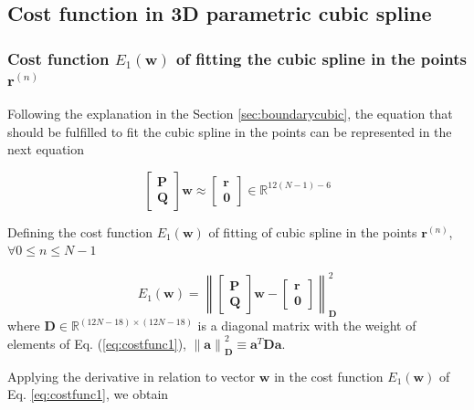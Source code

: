 \subsection{Cost function in 3D parametric cubic spline}

\subsubsection{Cost function $E_{1}(\mathbf{w})$ of fitting the cubic spline in the points $\mathbf{r}^{(n)}$}

Following the explanation in the Section \ref{sec:boundarycubic},
the equation that should be fulfilled to fit the cubic spline in the points can be represented in the next equation

\begin{equation}
\begin{bmatrix}
\mathbf{P}\\
\mathbf{Q}
\end{bmatrix}
\mathbf{w}
\approx
\begin{bmatrix}
\mathbf{r}\\
\mathbf{0}
\end{bmatrix}
\in \mathbb{R}^{12(N-1)-6}
\end{equation}

Defining the cost function $E_{1}(\mathbf{w})$ of fitting of cubic spline in the points $\mathbf{r}^{(n)}$,
$\forall 0\leq n\leq N-1$

\begin{equation}\label{eq:costfunc1}
E_{1}(\mathbf{w})
=
\left\|
\begin{bmatrix}
\mathbf{P}\\
\mathbf{Q}
\end{bmatrix}
\mathbf{w}
-
\begin{bmatrix}
\mathbf{r}\\
\mathbf{0}
\end{bmatrix}
\right\|_{\mathbf{D}}^{2}
\end{equation}
where $\mathbf{D}\in \mathbb{R}^{(12N-18)\times(12N-18)}$ is a diagonal matrix with the weight of elements of Eq. (\ref{eq:costfunc1}), 
$\left\|\mathbf{a}\right\|_{\mathbf{D}}^{2}\equiv \mathbf{a}^{T}\mathbf{D}\mathbf{a}$.


Applying the derivative in relation to vector $\mathbf{w}$
\cite[pp. 11]{petersen2008matrix}
in the cost function $E_{1}(\mathbf{w})$ of Eq. \ref{eq:costfunc1}, 
we obtain

